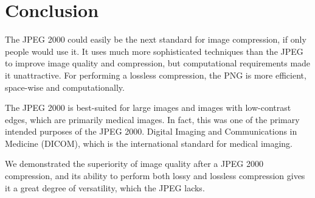 \documentclass[titlepage,12pt]{article}
\begin{document}
\section{Conclusion}

The JPEG 2000 could easily be the next standard for image compression, if only people would use it.
It uses much more sophisticated techniques than the JPEG to improve image quality and compression,
but computational requirements made it unattractive.
For performing a lossless compression, the PNG is more efficient, space-wise and computationally.

The JPEG 2000 is best-suited for large images and images with low-contrast edges,
which are primarily medical images.
In fact, this was one of the primary intended purposes of the JPEG 2000.
Digital Imaging and Communications in Medicine (DICOM), 
which is the international standard for medical imaging.\cite{dicom}

We demonstrated the superiority of image quality after a JPEG 2000 compression, 
and its ability to perform both lossy and lossless compression gives it a 
great degree of versatility, which the JPEG lacks.


\printbibliography


%
\end{document}
